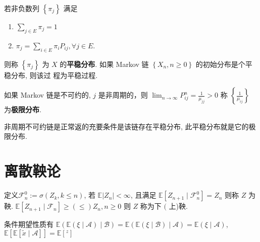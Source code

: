 \documentclass[10pt]{yerbaformat}
\begin{document}
\begin{definition}[平稳分布]
    若非负数列 $\left\{\pi_{j}\right\}$ 满足
    \begin{enumerate}
        \item $\sum_{j \in E} \pi_{j}=1$
        \item $\pi_{j}=\sum_{i \in E} \pi_{i} P_{i j}, \forall j \in E$.
    \end{enumerate}
    则称 $\left\{\pi_{j}\right\}$ 为 $X$ 的\textbf{平稳分布}. 如果 Markov 链 $\left\{X_{n}, n \geq 0\right\}$ 的初始分布是个平稳分布, 则该过
    程为平稳过程.
\end{definition}

\begin{lemma}
    如果 Markov 链是不可约的, $j$ 是非周期的，则 $\lim _{n \rightarrow \infty} P_{i j}^{n}=\frac{1}{\mu_{j j}}>0$ 称 $\left\{\frac{1}{\mu_{i j}}\right\}$ 为\textbf{极限分布}.
\end{lemma}

\begin{theorem}
    非周期不可约链是正常返的充要条件是该链存在平稳分布, 此平稳分布就是它的极限分布.
\end{theorem}

\section{离散鞅论}

\begin{definition}
    定义$\mathcal{F}_{n}^{0}:=\sigma\left(Z_{k}, k \leq n\right)$, 若 $\mathbb{E}\left|Z_{n}\right|<\infty$, 且满足 $\mathbb{E}\left[Z_{n+1} \mid \mathcal{F}_{n}^{0}\right]=Z_{n}$ 则称 $Z$ 为鞅. $\mathbb{E}\left[Z_{n+1} \mid \mathcal{F}_{n}\right] \geq(\leq) Z_{n}, n \geq 0$ 则 $Z$ 称为下 $($ 上)鞅.
\end{definition}

\par 条件期望性质有 $\mathbb{E}(\mathbb{E}(\xi \mid \mathcal{A}) \mid \mathcal{B})=\mathbb{E}(\mathbb{E}(\xi \mid \mathcal{B}) \mid \mathcal{A})=\mathbb{E}(\xi \mid \mathcal{A})$, $\mathbb{E}[\mathbb{E}[\tilde{x} \mid \mathcal{A}]]=\mathbb{E}\left[{ }^{z}\right]$


\end{document}
